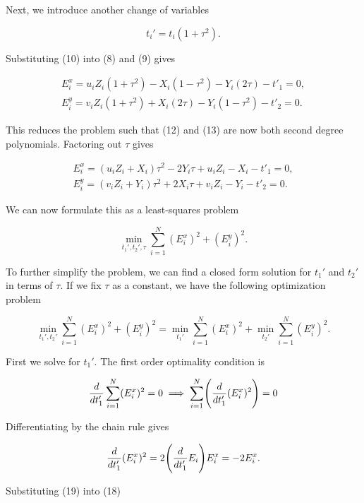 \documentclass[12pt]{article}
\newcommand{\parens}[1]{\mathopen{}\left( {#1}_{{}_{}}\,\negthickspace\right)\mathclose{}}
\begin{document}
Next, we introduce another change of variables

\begin{equation}
  t_i'=t_i(1+\tau^2).
\end{equation}
  
Substituting (10) into (8) and (9) gives

\begin{align}
  E_i^x=u_iZ_i(1+\tau^2)-X_i(1-\tau^2)-Y_i(2\tau)-t'_1=0,\\
  E_i^y=v_iZ_i(1+\tau^2)+X_i(2\tau)-Y_i(1-\tau^2)-t'_2=0.
\end{align}

This reduces the problem such that (12) and (13) are now both second degree polynomials. Factoring out $\tau$ gives

\begin{align}
  E_i^x=(u_iZ_i+X_i)\tau^2-2Y_i\tau+u_iZ_i-X_i-t'_1=0,\\
  E_i^y=(v_iZ_i+Y_i)\tau^2+2X_i\tau+v_iZ_i-Y_i-t'_2=0.
\end{align}

We can now formulate this as a least-squares problem

\begin{equation}
  \min_{t_1',t_2',\tau}\sum_{i=1}^N(E_i^x)^2+(E_i^y)^2.
\end{equation}

To further simplify the problem, we can find a closed form solution for $t_1'$ and $t_2'$ in terms of $\tau$. If we fix $\tau$ as a constant, we have the following optimization problem

\begin{equation}
  \min_{t_1',t_2'}\sum_{i=1}^N(E_i^x)^2+(E_i^y)^2=\min_{t_1'}\sum_{i=1}^N(E_i^x)^2+\min_{t_2'}\sum_{i=1}^N(E_i^y)^2.
\end{equation}

First we solve for $t_1'$. The first order optimality condition is

\begin{equation}
    \frac{d}{dt_1'}\sum_{i=1}^N(E_i^x)^2=0\implies \sum_{i=1}^N\parens{\frac{d}{dt_1'}(E_i^x)^2}=0
\end{equation}

Differentiating by the chain rule gives

\begin{equation}
  \frac{d}{dt_1'}(E_i^x)^2=2\parens{\frac{d}{dt_1'}E_{i}}E_i^x=-2E_i^x.
\end{equation}

Substituting (19) into (18)
\end{document}
